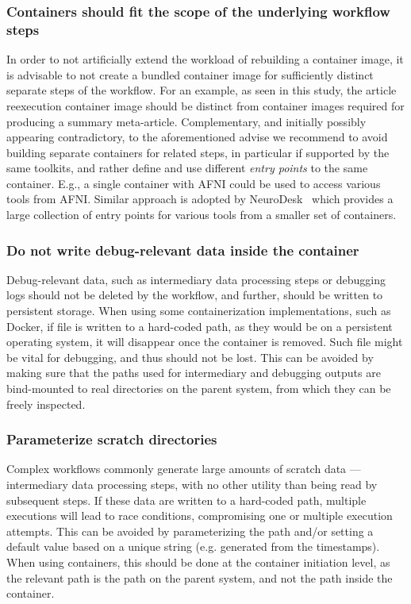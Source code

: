 \subsubsection{Containers should fit the scope of the underlying workflow steps}
In order to not artificially extend the workload of rebuilding a container image, it is advisable to not create a bundled container image for sufficiently distinct separate steps of the workflow.
For an example, as seen in this study, the article reexecution container image should be distinct from container images required for producing a summary meta-article.
Complementary, and initially possibly appearing contradictory, to the aforementioned advise we recommend to avoid building separate containers for related steps, in particular if supported by the same toolkits, and rather define and use different \emph{entry points} to the same container.
E.g., a single container with AFNI could be used to access various tools from AFNI.
Similar approach is adopted by NeuroDesk~\cite{neurodesk} which provides a large collection of entry points for various tools from a smaller set of containers.

\subsubsection{Do not write debug-relevant data inside the container}
Debug-relevant data, such as intermediary data processing steps or debugging logs should not be deleted by the workflow, and further, should be written to persistent storage.
When using some containerization implementations, such as Docker, if file is written to a hard-coded path, as they would be on a persistent operating system, it will disappear once the container is removed.
Such file might be vital for debugging, and thus should not be lost.
This can be avoided by making sure that the paths used for intermediary and debugging outputs are bind-mounted to real directories on the parent system, from which they can be freely inspected.

\subsubsection{Parameterize scratch directories}
Complex workflows commonly generate large amounts of scratch data — intermediary data processing steps, with no other utility than being read by subsequent steps.
If these data are written to a hard-coded path, multiple executions will lead to race conditions, compromising one or multiple execution attempts.
This can be avoided by parameterizing the path and/or setting a default value based on a unique string (e.g. generated from the timestamps).
When using containers, this should be done at the container initiation level, as the relevant path is the path on the parent system, and not the path inside the container.

